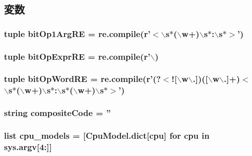 \subsection{変数}
\hypertarget{namespaceisa__parser_aa2e16188b1be76203f29251442174b29}{
\subsubsection[{bitOp1ArgRE}]{\setlength{\rightskip}{0pt plus 5cm}tuple {\bf bitOp1ArgRE} = re.compile(r'$<$$\backslash$s$\ast$($\backslash$w+)$\backslash$s$\ast$:$\backslash$s$\ast$$>$')}}
\label{namespaceisa__parser_aa2e16188b1be76203f29251442174b29}
\hypertarget{namespaceisa__parser_a79da599f65ccf900ab7979dbbebd74fa}{
\subsubsection[{bitOpExprRE}]{\setlength{\rightskip}{0pt plus 5cm}tuple {\bf bitOpExprRE} = re.compile(r'$\backslash$)}}
\label{namespaceisa__parser_a79da599f65ccf900ab7979dbbebd74fa}
\hypertarget{namespaceisa__parser_a4216ae3b561059a2a248b592b86a4de5}{
\subsubsection[{bitOpWordRE}]{\setlength{\rightskip}{0pt plus 5cm}tuple {\bf bitOpWordRE} = re.compile(r'(?$<$!\mbox{[}$\backslash$w$\backslash$.\mbox{]})(\mbox{[}$\backslash$w$\backslash$.\mbox{]}+)$<$$\backslash$s$\ast$($\backslash$w+)$\backslash$s$\ast$:$\backslash$s$\ast$($\backslash$w+)$\backslash$s$\ast$$>$')}}
\label{namespaceisa__parser_a4216ae3b561059a2a248b592b86a4de5}
\hypertarget{namespaceisa__parser_a11f5a6b80110eac01720f07c7d95f9b8}{
\subsubsection[{compositeCode}]{\setlength{\rightskip}{0pt plus 5cm}string {\bf compositeCode} = ''}}
\label{namespaceisa__parser_a11f5a6b80110eac01720f07c7d95f9b8}
\hypertarget{namespaceisa__parser_affb051454a88437b53c5cdd67419ea1c}{
\subsubsection[{cpu\_\-models}]{\setlength{\rightskip}{0pt plus 5cm}list {\bf cpu\_\-models} = \mbox{[}CpuModel.dict\mbox{[}cpu\mbox{]} for cpu in sys.argv\mbox{[}4:\mbox{]}\mbox{]}}}
